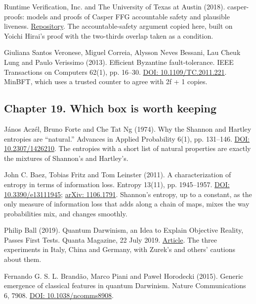 \documentclass[11pt,twoside]{article}
\theoremstyle{thielethm}
\theoremstyle{thieledef}
\theoremstyle{thieledef}
\theoremstyle{thieledef}
\theoremstyle{thielethm}
\theoremstyle{thieleobs}
\theoremstyle{thielethm}
\begin{document}
\noindent Runtime Verification, Inc. and The University of Texas at Austin (2018). casper-proofs: models and proofs of Casper FFG accountable safety and plausible liveness. \href{https://github.com/runtimeverification/casper-proofs}{Repository}. The accountable-safety argument copied here, built on Yoichi Hirai's proof with the two-thirds overlap taken as a condition.
\par\medskip

\noindent Giuliana Santos Veronese, Miguel Correia, Alysson Neves Bessani, Lau Cheuk Lung and Paulo Verissimo (2013). Efficient Byzantine fault-tolerance. IEEE Transactions on Computers 62(1), pp. 16--30. \href{https://doi.org/10.1109/TC.2011.221}{DOI: 10.1109/TC.2011.221}. MinBFT, which uses a trusted counter to agree with 2f + 1 copies.
\par\medskip

\subsection*{Chapter 19. Which box is worth keeping}

\noindent J\'anos Acz\'el, Bruno Forte and Che Tat Ng (1974). Why the Shannon and Hartley entropies are ``natural.'' Advances in Applied Probability 6(1), pp. 131--146. \href{https://doi.org/10.2307/1426210}{DOI: 10.2307/1426210}. The entropies with a short list of natural properties are exactly the mixtures of Shannon's and Hartley's.
\par\medskip

\noindent John C. Baez, Tobias Fritz and Tom Leinster (2011). A characterization of entropy in terms of information loss. Entropy 13(11), pp. 1945--1957. \href{https://doi.org/10.3390/e13111945}{DOI: 10.3390/e13111945}; \href{https://arxiv.org/abs/1106.1791}{arXiv: 1106.1791}. Shannon's entropy, up to a constant, as the only measure of information loss that adds along a chain of maps, mixes the way probabilities mix, and changes smoothly.
\par\medskip

\noindent Philip Ball (2019). Quantum Darwinism, an Idea to Explain Objective Reality, Passes First Tests. Quanta Magazine, 22 July 2019. \href{https://www.quantamagazine.org/quantum-darwinism-an-idea-to-explain-objective-reality-passes-first-tests-20190722/}{Article}. The three experiments in Italy, China and Germany, with Zurek's and others' cautions about them.
\par\medskip

\noindent Fernando G. S. L. Brand\~ao, Marco Piani and Pawe\l{} Horodecki (2015). Generic emergence of classical features in quantum Darwinism. Nature Communications 6, 7908. \href{https://doi.org/10.1038/ncomms8908}{DOI: 10.1038/ncomms8908}.
\par\medskip
\end{document}
